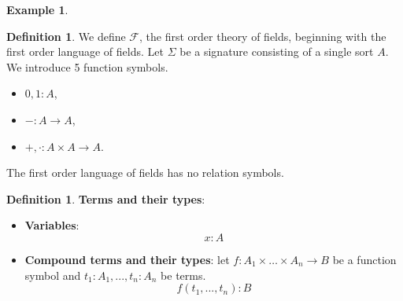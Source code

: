 \documentclass[12pt]{article}
\theoremstyle{plain}
\theoremstyle{definition}
\newtheorem{defn}[thm]{Definition} %
\newtheorem{example}[thm]{Example}
\newcommand{\call}[1]{\mathcal{#1}}
\newcommand{\lto}{\longrightarrow}
\begin{document}
\begin{example}
	\begin{defn}\label{def:FoT_fields}
		We define $\call{F}$, the first order theory of fields, beginning with the first order language of fields. Let $\Sigma$ be a signature consisting of a single sort $A$. We introduce 5 function symbols.
		\begin{itemize}
			\item $0,1: A$,
			\item $-: A \lto A$,
			\item $+, \cdot: A \times A \lto A$.
		\end{itemize}
		The first order language of fields has no relation symbols.
	\end{defn}
	\end{example}

\begin{defn}
	\textbf{Terms and their types}:
	\begin{itemize}
		\item \textbf{Variables}:
		\begin{equation}
			x:A
			\end{equation}
		\item \textbf{Compound terms and their types}: let $f: A_1 \times \hdots \times A_n \lto B$ be a function symbol and $t_1:A_1,...,t_n:A_n$ be terms.
		\begin{equation}
			f(t_1,...,t_n): B
			\end{equation}
	\end{itemize}
\end{defn}
\end{document}
